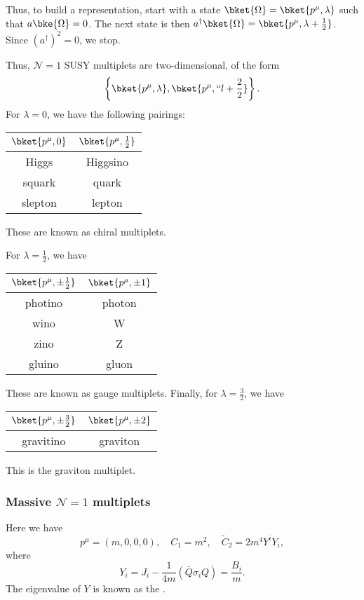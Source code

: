 \documentclass[a4paper]{article}
\begin{document}
Thus, to build a representation, start with a state $\bket{\Omega} = \bket{p^\mu, \lambda}$ such that $a \bke{\Omega} = 0$. The next state is then $a^\dagger \bket{\Omega} = \bket{p^\mu, \lambda + \frac{1}{2}}$. Since $(a^\dagger)^2 = 0$, we stop. %

Thus, $\mathcal{N} = 1$ SUSY multiplets are two-dimensional, of the form %
\[
  \left\{\bket{p^\mu, \lambda}, \bket{p^\mu, ``l + \frac{2}{2}}\right\}.
\]
For $\lambda = 0$, we have the following pairings:
\begin{center}
  \begin{tabular}{cc}
    \toprule
    $\bket{p^{\mu}, 0}$ & $\bket{p^\mu, \frac{1}{2}}$\\
    \midrule
    Higgs & Higgsino\\
    squark & quark\\
    slepton & lepton\\
    \bottomrule
  \end{tabular}
\end{center}
These are known as chiral multiplets.

For $\lambda = \frac{1}{2}$, we have
\begin{center}
  \begin{tabular}{cc}
    \toprule
    $\bket{p^{\mu}, \pm \frac{1}{2}}$ & $\bket{p^\mu, \pm 1}$\\
    \midrule
    photino & photon\\
    wino & W\\
    zino & Z\\
    gluino & gluon\\ %
    \bottomrule
  \end{tabular}
\end{center}
These are known as gauge multiplets. Finally, for $\lambda = \frac{3}{2}$, we have
\begin{center}
  \begin{tabular}{cc}
    \toprule
    $\bket{p^{\mu}, \pm \frac{3}{2}}$ & $\bket{p^\mu, \pm 2}$\\
    \midrule
    gravitino & graviton\\
    \bottomrule
  \end{tabular}
\end{center}
This is the graviton multiplet.

\subsubsection*{Massive $\mathcal{N}=1$ multiplets}
Here we have
\[
  p^\mu = (m, 0, 0, 0),\quad C_1 = m^2,\quad \tilde{C}_2 = 2m^4 Y^i Y_i,
\]
where
\[
  Y_i = J_i - \frac{1}{4m} (\bar{Q} \sigma_i Q) = \frac{B_i}{m}.
\]
The eigenvalue of $Y$ is known as the .
\end{document}
